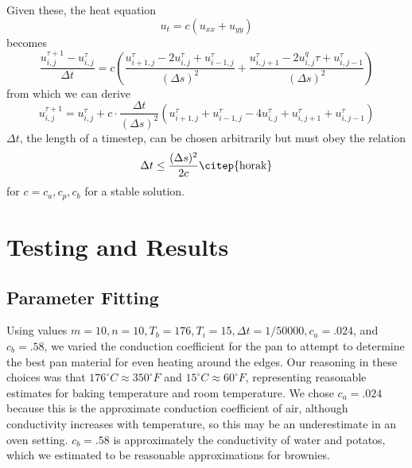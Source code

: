 \documentclass[12pt]{reedmcm}
\begin{document}
Given these, the heat equation
\[u_t = c (u_{xx} + u_{yy})\]
becomes
\[\dfrac{u_{i,j}^{\tau+1} - u_{i,j}^\tau}{\Delta t} = c  \left(\dfrac{u_{i+1,j}^\tau - 2u_{i,j}^\tau + u_{i-1,j}^\tau}{(\Delta s)^2} + \dfrac{u_{i,j+1}^\tau - 2u_{i,j}^q\tau + u_{i,j-1}^\tau}{(\Delta s)^2}\right)\]
from which we can derive
\[u_{i,j}^{\tau+1} = u_{i,j}^\tau + c \cdot \frac{\Delta t}{(\Delta s)^2} \left(u_{i+1,j}^\tau + u_{i-1,j}^\tau - 4u_{i,j}^\tau + u_{i,j+1}^\tau + u_{i,j-1}^\tau \right)\]
$\Delta t$, the length of a timestep, can be chosen arbitrarily but must obey the relation
\[\Delta t \leq \frac{(\Delta s)^2}{2c} \text{\citep{horak}}\]
for $c = c_a,c_p,c_b$ for a stable solution.\\

\section{Testing and Results}
\subsection{Parameter Fitting}
Using values $m = 10, n=10, T_b = 176, T_i = 15, \Delta t = 1/50000, c_a = .024$, and $c_b = .58$, we varied the conduction coefficient for the pan to attempt to determine the best pan material for even heating around the edges.  Our reasoning in these choices was that $176^\circ C \approx 350^\circ F$ and $15^\circ C \approx 60^\circ F$, representing reasonable estimates for baking temperature and room temperature.  We chose $c_a = .024$ because this is the approximate conduction coefficient of air, although conductivity increases with temperature, so this may be an underestimate in an oven setting.  $c_b = .58$ is approximately the conductivity of water and potatos, which we estimated to be reasonable approximations for brownies.\\
\end{document}
